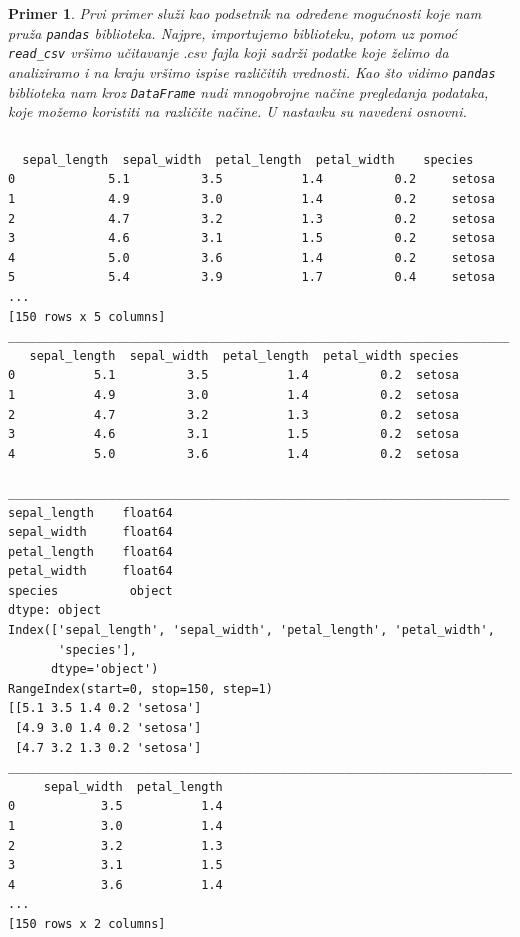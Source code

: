 \documentclass[a4paper]{article}
\newtheorem{primer}{Primer}[section]
\begin{document}
\begin{primer}
Prvi primer služi kao podsetnik na određene mogućnosti koje nam pruža \texttt{pandas} biblioteka.  
Najpre, importujemo biblioteku, potom uz pomoć \texttt{read\_csv} vršimo učitavanje $.csv$ fajla koji sadrži podatke koje želimo da analiziramo i na kraju vršimo ispise različitih vrednosti. Kao što vidimo \texttt{pandas} biblioteka nam kroz \texttt{DataFrame} nudi mnogobrojne načine pregledanja podataka, koje možemo koristiti na različite načine. U nastavku su navedeni osnovni. 
\end{primer}
\inputminted{python}{Codes/1/pandas-example.py}
\begin{lstlisting}
  sepal_length  sepal_width  petal_length  petal_width    species
0        	  5.1          3.5           1.4          0.2     setosa
1             4.9          3.0           1.4          0.2     setosa
2             4.7          3.2           1.3          0.2     setosa
3             4.6          3.1           1.5          0.2     setosa
4             5.0          3.6           1.4          0.2     setosa
5             5.4          3.9           1.7          0.4     setosa
...
[150 rows x 5 columns]
______________________________________________________________________
   sepal_length  sepal_width  petal_length  petal_width species
0           5.1          3.5           1.4          0.2  setosa
1           4.9          3.0           1.4          0.2  setosa
2           4.7          3.2           1.3          0.2  setosa
3           4.6          3.1           1.5          0.2  setosa
4           5.0          3.6           1.4          0.2  setosa

______________________________________________________________________
sepal_length    float64
sepal_width     float64
petal_length    float64
petal_width     float64
species          object
dtype: object
Index(['sepal_length', 'sepal_width', 'petal_length', 'petal_width',
       'species'],
      dtype='object')
RangeIndex(start=0, stop=150, step=1)
[[5.1 3.5 1.4 0.2 'setosa']
 [4.9 3.0 1.4 0.2 'setosa']
 [4.7 3.2 1.3 0.2 'setosa']
________________________________________________________________________
     sepal_width  petal_length
0            3.5           1.4
1            3.0           1.4
2            3.2           1.3
3            3.1           1.5
4            3.6           1.4
...
[150 rows x 2 columns]
\end{lstlisting}
\end{document}
